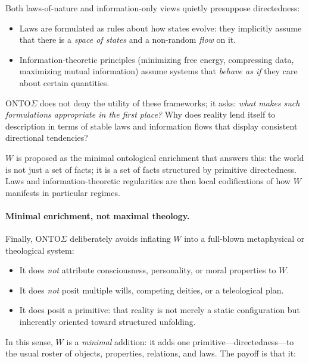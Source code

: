\documentclass[12pt,a4paper]{report}
\newcommand{\Will}{W}
\begin{document}
Both laws-of-nature and information-only views quietly presuppose directedness:

\begin{itemize}[leftmargin=2em]
    \item Laws are formulated as rules about how states evolve: they implicitly assume that there is a \emph{space of states} and a non-random \emph{flow} on it.
    \item Information-theoretic principles (minimizing free energy, compressing data, maximizing mutual information) assume systems that \emph{behave as if} they care about certain quantities.
\end{itemize}

ONTO$\Sigma$ does not deny the utility of these frameworks; it asks: \emph{what makes such formulations appropriate in the first place?} Why does reality lend itself to description in terms of stable laws and information flows that display consistent directional tendencies?

\(\Will\) is proposed as the minimal ontological enrichment that answers this: the world is not just a set of facts; it is a set of facts structured by primitive directedness. Laws and information-theoretic regularities are then local codifications of how \(\Will\) manifests in particular regimes.

\paragraph{Minimal enrichment, not maximal theology.}

Finally, ONTO$\Sigma$ deliberately avoids inflating \(\Will\) into a full-blown metaphysical or theological system:

\begin{itemize}[leftmargin=2em]
    \item It does \emph{not} attribute consciousness, personality, or moral properties to \(\Will\).
    \item It does \emph{not} posit multiple wills, competing deities, or a teleological plan.
    \item It does posit a primitive: that reality is not merely a static configuration but inherently oriented toward structured unfolding.
\end{itemize}

In this sense, \(\Will\) is a \emph{minimal} addition: it adds one primitive---directedness---to the usual roster of objects, properties, relations, and laws. The payoff is that it:
\end{document}
